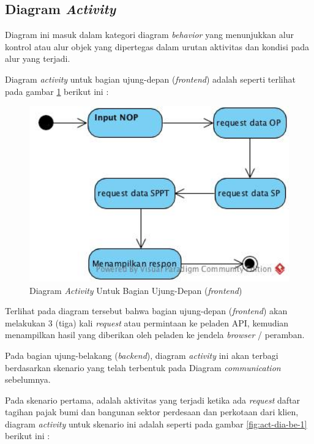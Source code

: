 \documentclass[pdftex,12pt, oneside]{article}
\begin{document}
\subsection{Diagram \textit{Activity}}

Diagram ini masuk dalam kategori diagram \textit{behavior} yang menunjukkan alur kontrol atau alur objek yang dipertegas dalam urutan aktivitas dan kondisi pada alur yang terjadi.

Diagram \textit{activity} untuk bagian ujung-depan (\textit{frontend}) adalah seperti terlihat pada gambar \ref{fig:act-dia-fe} berikut ini :

\begin{figure}[H]
	\centering
	\includegraphics[width=1\textwidth]{./resources/act-dia-fe}
	\caption{Diagram \textit{Activity} Untuk Bagian Ujung-Depan (\textit{frontend})}
	\label{fig:act-dia-fe}
\end{figure}

Terlihat pada diagram tersebut bahwa bagian ujung-depan (\textit{frontend}) akan melakukan 3 (tiga) kali \textit{request} atau permintaan ke peladen API, kemudian menampilkan hasil yang diberikan oleh peladen ke jendela \textit{browser} / peramban.

Pada bagian ujung-belakang (\textit{backend}), diagram \textit{activity} ini akan terbagi berdasarkan skenario yang telah terbentuk pada Diagram \textit{communication} sebelumnya.

Pada skenario pertama, adalah aktivitas yang terjadi ketika ada \textit{request} daftar tagihan pajak bumi dan bangunan sektor perdesaan dan perkotaan dari klien, diagram \textit{activity} untuk skenario ini adalah seperti pada gambar \ref{fig:act-dia-be-1} berikut ini :
\end{document}
